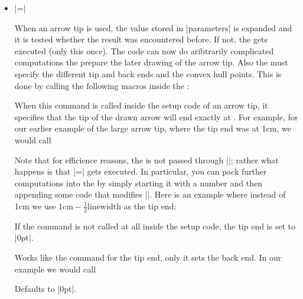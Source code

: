 \begin{command}{\pgfdeclarearrow{}}
\begin{itemize}
    Note that the line width (|\pgflinewidth|) and the inner line
    width (|\pgfinnerlinewidth|) are always parameters and need not be
    specified in the |parameters|.

    It is important to get this parameter right. Otherwise, arrow tips
    may look wrong because \pgfname\ thinks that it can reuse some
    code when, in reality, this code actually depends on a parameter
    not listed here.
    
  \item {}|=|

    When an arrow tip is used, the value stored in |parameters| is
    expanded and it is tested whether the result was encountered
    before. If not, the  gets executed (only this
    once). The code can now do aribtrarily complicated computations
    the prepare the later drawing of the arrow tip. Also the
     must specify the different tip and back ends and the
    convex hull points. This is done by calling the following macros
    inside the :

    \begin{command}{\pgfarrowssettipend{}}
      When this command is called inside the setup code of an arrow
      tip, it specifies that the tip of the drawn arrow will end
      exactly at . For example, for our earlier
      example of the large arrow tip, where the tip end was at 1cm, we
      would call
\begin{codeexample}
\pgfarrowssettipend{1cm}        
\end{codeexample}
      Note that for efficience reasons, the  is not
      passed through |\pgfmathsetlength|; rather what happens is that
      |\pgf@x=| gets executed. In particular, you can
      pack further computations into the  by simply
      starting it with a number and then appending some code that
      modifies |\pgf@x|. Here is an example where instead of 1cm we
      use $1\mathrm{cm} - \frac12\mathrm{linewidth}$ as the tip end:
\begin{codeexample}
\end{codeexample}
      If the command is not called at all inside the setup code, the
      tip end is set to |0pt|.
    \end{command}

    \begin{command}{\pgfarrowssetbackend{}}
      Works like the command for the tip end, only it sets the back
      end. In our example we would call
\begin{codeexample}
\pgfarrowssettipend{-3cm}        
\end{codeexample}
      Defaults to |0pt|.
    \end{command}


\end{itemize}
\end{command}
